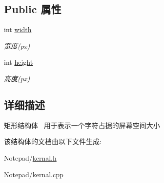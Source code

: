 \subsection*{Public 属性}
\begin{DoxyCompactItemize}
\item 
\mbox{\label{struct_s_i_r_e_c_t_a99dbd77d045cc587f0c1f40bbba99ac8}} 
int \hyperlink{struct_s_i_r_e_c_t_a99dbd77d045cc587f0c1f40bbba99ac8}{width}
\begin{DoxyCompactList}\small\item\em 宽度(px) \end{DoxyCompactList}\item 
\mbox{\label{struct_s_i_r_e_c_t_a6577f3092897d4bef17aab5ec4d62819}} 
int \hyperlink{struct_s_i_r_e_c_t_a6577f3092897d4bef17aab5ec4d62819}{height}
\begin{DoxyCompactList}\small\item\em 高度(px) \end{DoxyCompactList}\end{DoxyCompactItemize}


\subsection{详细描述}
矩形结构体~\newline
用于表示一个字符占据的屏幕空间大小 

该结构体的文档由以下文件生成\+:\begin{DoxyCompactItemize}
\item 
Notepad/\hyperlink{kernal_8h}{kernal.\+h}\item 
Notepad/kernal.\+cpp\end{DoxyCompactItemize}
